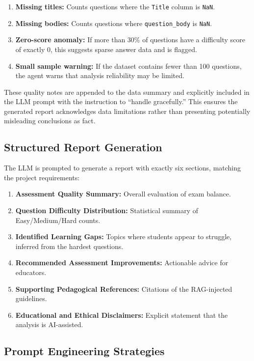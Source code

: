 \documentclass[12pt, a4paper]{article}
\begin{document}
\begin{enumerate}
    \item \textbf{Missing titles:} Counts questions where the \texttt{Title} column is \texttt{NaN}.
    \item \textbf{Missing bodies:} Counts questions where \texttt{question\_body} is \texttt{NaN}.
    \item \textbf{Zero-score anomaly:} If more than 30\% of questions have a difficulty score of exactly 0, this suggests sparse answer data and is flagged.
    \item \textbf{Small sample warning:} If the dataset contains fewer than 100 questions, the agent warns that analysis reliability may be limited.
\end{enumerate}

These quality notes are appended to the data summary and explicitly included in the LLM prompt with the instruction to ``handle gracefully.'' This ensures the generated report acknowledges data limitations rather than presenting potentially misleading conclusions as fact.

\subsection{Structured Report Generation}

The LLM is prompted to generate a report with exactly six sections, matching the project requirements:

\begin{enumerate}
    \item \textbf{Assessment Quality Summary:} Overall evaluation of exam balance.
    \item \textbf{Question Difficulty Distribution:} Statistical summary of Easy/Medium/Hard counts.
    \item \textbf{Identified Learning Gaps:} Topics where students appear to struggle, inferred from the hardest questions.
    \item \textbf{Recommended Assessment Improvements:} Actionable advice for educators.
    \item \textbf{Supporting Pedagogical References:} Citations of the RAG-injected guidelines.
    \item \textbf{Educational and Ethical Disclaimers:} Explicit statement that the analysis is AI-assisted.
\end{enumerate}

\subsection{Prompt Engineering Strategies}
\end{document}
